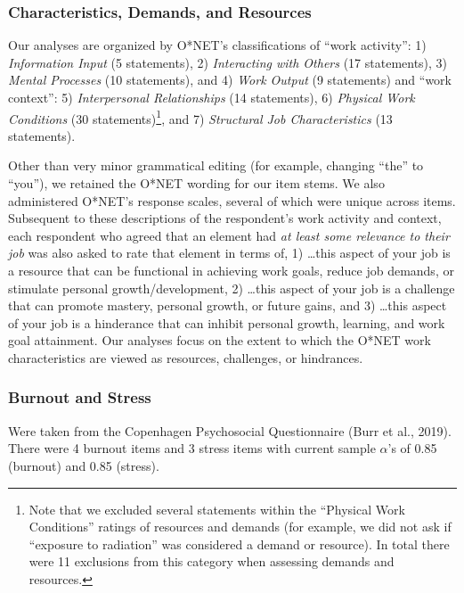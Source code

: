 \documentclass[
  english,
  man]{apa6}
\begin{document}
\hypertarget{characteristics-demands-and-resources}{%
\subsubsection{Characteristics, Demands, and Resources}\label{characteristics-demands-and-resources}}

Our analyses are organized by O*NET's classifications of \enquote{work activity}: 1) \emph{Information Input} (5 statements), 2) \emph{Interacting with Others} (17 statements), 3) \emph{Mental Processes} (10 statements), and 4) \emph{Work Output} (9 statements) and \enquote{work context}: 5) \emph{Interpersonal Relationships} (14 statements), 6) \emph{Physical Work Conditions} (30 statements)\footnote{Note that we excluded several statements within the \enquote{Physical Work Conditions} ratings of resources and demands (for example, we did not ask if \enquote{exposure to radiation} was considered a demand or resource). In total there were 11 exclusions from this category when assessing demands and resources.}, and 7) \emph{Structural Job Characteristics} (13 statements).

Other than very minor grammatical editing (for example, changing \enquote{the} to \enquote{you}), we retained the O*NET wording for our item stems. We also administered O*NET's response scales, several of which were unique across items. Subsequent to these descriptions of the respondent's work activity and context, each respondent who agreed that an element had \emph{at least some relevance to their job} was also asked to rate that element in terms of, 1) \ldots this aspect of your job is a resource that can be functional in achieving work goals, reduce job demands, or stimulate personal growth/development, 2) \ldots this aspect of your job is a challenge that can promote mastery, personal growth, or future gains, and 3) \ldots this aspect of your job is a hinderance that can inhibit personal growth, learning, and work goal attainment. Our analyses focus on the extent to which the O*NET work characteristics are viewed as resources, challenges, or hindrances.

\hypertarget{burnout-and-stress}{%
\subsubsection{Burnout and Stress}\label{burnout-and-stress}}

Were taken from the Copenhagen Psychosocial Questionnaire (Burr et al., 2019). There were 4 burnout items and 3 stress items with current sample \(\alpha\)'s of 0.85 (burnout) and 0.85 (stress).
\end{document}
